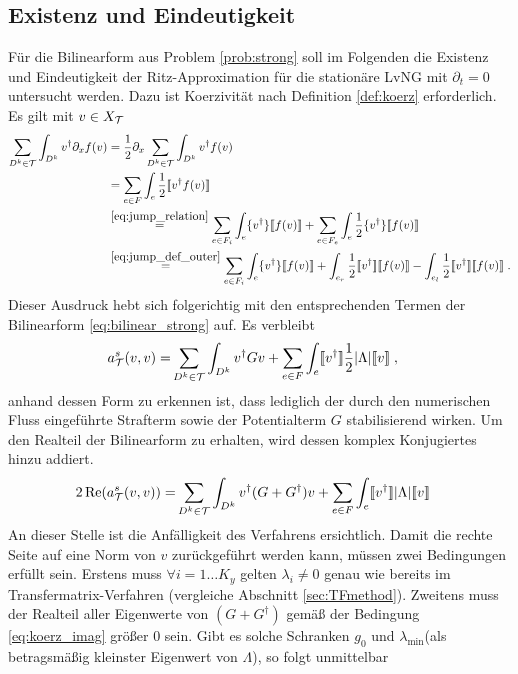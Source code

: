 \subsection{Existenz und Eindeutigkeit}
Für die Bilinearform aus Problem \ref{prob:strong} soll im Folgenden die Existenz und Eindeutigkeit der Ritz-Approximation für die stationäre LvNG mit $\partial_t=0$ untersucht werden. Dazu ist Koerzivität nach Definition \ref{def:koerz} erforderlich. Es gilt mit $v\in X_{\mathcal{T}}$
\begin{align*}
  \sum_{D^k\in\mathcal{T}}\int_{D^k} v^{\dagger} \partial_x f(v) &=
  \frac{1}{2}\partial_x \sum_{D^k\in\mathcal{T}}\int_{D^k} v^{\dagger} f(v) \\
  &= \sum_{e\in F}\int_e \frac{1}{2}\llbracket v^{\dagger} f(v) \rrbracket \\
  &\stackrel{\eqref{eq:jump_relation}}{=}  \sum_{e\in F_i}\int_e \{ v^{\dagger} \} \llbracket f(v) \rrbracket + \sum_{e\in F_e}\int_{e} \frac{1}{2}\{ v^{\dagger} \} \llbracket f(v) \rrbracket \\
  &\stackrel{\eqref{eq:jump_def_outer}}{=} \sum_{e\in F_i}\int_e \{ v^{\dagger} \} \llbracket f(v) \rrbracket + \int_{e_r}\frac{1}{2} \llbracket v^{\dagger} \rrbracket\llbracket f(v) \rrbracket - \int_{e_l}\frac{1}{2} \llbracket v^{\dagger} \rrbracket\llbracket f(v) \rrbracket \; .
\end{align*}
Dieser Ausdruck hebt sich folgerichtig mit den entsprechenden Termen der Bilinearform \eqref{eq:bilinear_strong} auf. Es verbleibt
\begin{equation}
  \begin{aligned}
    a_{\mathcal{T}}^s(v, v) = &\sum_{D^k\in\mathcal{T}}\int_{D^k} v^{\dagger} G v
    + \sum_{e\in F}\int_e  \llbracket v^{\dagger} \rrbracket \frac{1}{2}|\Lambda| \llbracket v \rrbracket \; ,
  \end{aligned}
\end{equation}
anhand dessen Form zu erkennen ist, dass lediglich der durch den numerischen Fluss eingeführte Strafterm sowie der Potentialterm $G$ stabilisierend wirken. Um den Realteil der Bilinearform zu erhalten, wird dessen komplex Konjugiertes hinzu addiert.
\begin{equation}
  \begin{aligned}
    2\operatorname{Re} (a_{\mathcal{T}}^s(v, v)) = &\sum_{D^k\in\mathcal{T}}\int_{D^k} v^{\dagger} (G+G^{\dagger}) v
    + \sum_{e\in F}\int_e  \llbracket v^{\dagger} \rrbracket |\Lambda| \llbracket v \rrbracket
  \end{aligned}
  \label{eq:koerz_result}
\end{equation}
An dieser Stelle ist die Anfälligkeit des Verfahrens ersichtlich. Damit die rechte Seite auf eine Norm von $v$ zurückgeführt werden kann, müssen zwei Bedingungen erfüllt sein. Erstens muss $\forall i=1\dots K_y$ gelten $\lambda_i\neq 0$ genau wie bereits im Transfermatrix-Verfahren (vergleiche Abschnitt \ref{sec:TFmethod}). Zweitens muss der Realteil aller Eigenwerte von $(G+G^{\dagger})$ gemäß der Bedingung \eqref{eq:koerz_imag} größer 0 sein. Gibt es solche Schranken $g_0$ und $\lambda_{\text{min}}$(als betragsmäßig kleinster Eigenwert von $\Lambda$), so folgt unmittelbar

